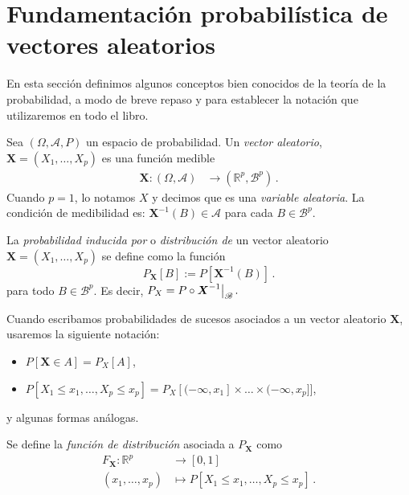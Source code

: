 \section{Fundamentación probabilística de vectores aleatorios}

En esta sección definimos algunos conceptos bien conocidos de la teoría de la probabilidad,
a modo de breve repaso y para establecer la notación que utilizaremos en todo el libro.


\begin{ndef}
    Sea $(\Omega, \mathscr{A}, P)$ un espacio de probabilidad. Un \emph{vector aleatorio}, $\boldsymbol X = (X_1, \dots, X_p)$ es una función medible
    \begin{align*}
      \boldsymbol X:(\Omega, \mathscr{A}) &\rightarrow (\mathbb{R}^p, \mathscr{B}^p)\,.
    \end{align*}
     Cuando $p=1$, lo notamos $X$ y decimos que es una \emph{variable aleatoria}.
    La condición de medibilidad es: \(\boldsymbol X^{-1}(B) \in \mathscr{A}\) para cada \( B \in \mathscr{B}^p\).
\end{ndef}



\begin{ndef}
    La \emph{probabilidad inducida por} o \emph{distribución de} un vector aleatorio $\boldsymbol X = (X_1, \dots, X_p)$ se define como la función
    \[
    P_{\boldsymbol X}[B] := P[\boldsymbol X^{-1}(B)]\,.\] para todo \(B \in \mathscr{B}^p\). Es decir, $P_X = P \circ \restr{\boldsymbol X^{-1}}{\mathscr{B}}\,.$
\end{ndef}

\begin{notacion}
  Cuando escribamos probabilidades de sucesos asociados a un vector aleatorio $\boldsymbol X$, usaremos la siguiente notación:
  \begin{itemize}
  \item $P[\boldsymbol X \in A] = P_X[A]$,
  \item $P[X_1 \le x_1, \dots, X_p \le x_p] = P_X[(-\infty, x_1]\times \dots \times (-\infty, x_p]]$,
  \end{itemize}
  y algunas formas análogas.
\end{notacion}

\begin{ndef}
    Se define la \emph{función de distribución} asociada a $P_{\boldsymbol X}$ como
    \begin{align*}
    F_{\boldsymbol X}:\mathbb{R}^p &\rightarrow [0,1] \\
    (x_1,\dots,x_p) &\mapsto P[X_1 \leq x_1, \dots, X_p \leq x_p]\,.
    \end{align*}
\end{ndef}

